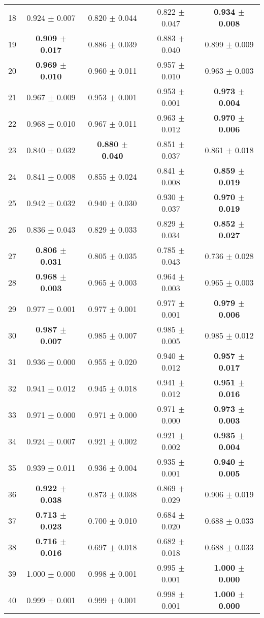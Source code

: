\begin{table}[!ht]
{\begin{tabular}{r c c c c}
18 & 0.924 $\pm$ 0.007 & 0.820 $\pm$ 0.044 & 0.822 $\pm$ 0.047 & \textbf{0.934 $\pm$ 0.008} \\
19 & \textbf{0.909 $\pm$ 0.017} & 0.886 $\pm$ 0.039 & 0.883 $\pm$ 0.040 & 0.899 $\pm$ 0.009 \\
20 & \textbf{0.969 $\pm$ 0.010} & 0.960 $\pm$ 0.011 & 0.957 $\pm$ 0.010 & 0.963 $\pm$ 0.003 \\
21 & 0.967 $\pm$ 0.009 & 0.953 $\pm$ 0.001 & 0.953 $\pm$ 0.001 & \textbf{0.973 $\pm$ 0.004} \\
22 & 0.968 $\pm$ 0.010 & 0.967 $\pm$ 0.011 & 0.963 $\pm$ 0.012 & \textbf{0.970 $\pm$ 0.006} \\
23 & 0.840 $\pm$ 0.032 & \textbf{0.880 $\pm$ 0.040} & 0.851 $\pm$ 0.037 & 0.861 $\pm$ 0.018 \\
24 & 0.841 $\pm$ 0.008 & 0.855 $\pm$ 0.024 & 0.841 $\pm$ 0.008 & \textbf{0.859 $\pm$ 0.019} \\
25 & 0.942 $\pm$ 0.032 & 0.940 $\pm$ 0.030 & 0.930 $\pm$ 0.037 & \textbf{0.970 $\pm$ 0.019} \\
26 & 0.836 $\pm$ 0.043 & 0.829 $\pm$ 0.033 & 0.829 $\pm$ 0.034 & \textbf{0.852 $\pm$ 0.027} \\
27 & \textbf{0.806 $\pm$ 0.031} & 0.805 $\pm$ 0.035 & 0.785 $\pm$ 0.043 & 0.736 $\pm$ 0.028 \\
28 & \textbf{0.968 $\pm$ 0.003} & 0.965 $\pm$ 0.003 & 0.964 $\pm$ 0.003 & 0.965 $\pm$ 0.003 \\
29 & 0.977 $\pm$ 0.001 & 0.977 $\pm$ 0.001 & 0.977 $\pm$ 0.001 & \textbf{0.979 $\pm$ 0.006} \\
30 & \textbf{0.987 $\pm$ 0.007} & 0.985 $\pm$ 0.007 & 0.985 $\pm$ 0.005 & 0.985 $\pm$ 0.012 \\
31 & 0.936 $\pm$ 0.000 & 0.955 $\pm$ 0.020 & 0.940 $\pm$ 0.012 & \textbf{0.957 $\pm$ 0.017} \\
32 & 0.941 $\pm$ 0.012 & 0.945 $\pm$ 0.018 & 0.941 $\pm$ 0.012 & \textbf{0.951 $\pm$ 0.016} \\
33 & 0.971 $\pm$ 0.000 & 0.971 $\pm$ 0.000 & 0.971 $\pm$ 0.000 & \textbf{0.973 $\pm$ 0.003} \\
34 & 0.924 $\pm$ 0.007 & 0.921 $\pm$ 0.002 & 0.921 $\pm$ 0.002 & \textbf{0.935 $\pm$ 0.004} \\
35 & 0.939 $\pm$ 0.011 & 0.936 $\pm$ 0.004 & 0.935 $\pm$ 0.001 & \textbf{0.940 $\pm$ 0.005} \\
36 & \textbf{0.922 $\pm$ 0.038} & 0.873 $\pm$ 0.038 & 0.869 $\pm$ 0.029 & 0.906 $\pm$ 0.019 \\
37 & \textbf{0.713 $\pm$ 0.023} & 0.700 $\pm$ 0.010 & 0.684 $\pm$ 0.020 & 0.688 $\pm$ 0.033 \\
38 & \textbf{0.716 $\pm$ 0.016} & 0.697 $\pm$ 0.018 & 0.682 $\pm$ 0.018 & 0.688 $\pm$ 0.033 \\
39 & 1.000 $\pm$ 0.000 & 0.998 $\pm$ 0.001 & 0.995 $\pm$ 0.001 & \textbf{1.000 $\pm$ 0.000} \\
40 & 0.999 $\pm$ 0.001 & 0.999 $\pm$ 0.001 & 0.998 $\pm$ 0.001 & \textbf{1.000 $\pm$ 0.000} \\
\end{tabular}}
\end{table}
